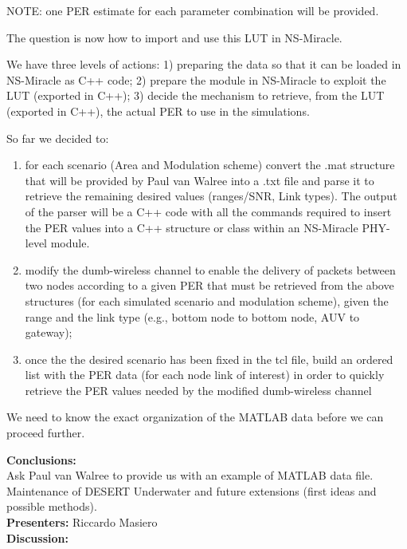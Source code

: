 \documentclass[11pt,journal,draftclsnofoot,onecolumn,twoside,letterpaper]{IEEEtran}
\theoremstyle{definition} \newtheorem{definition}[]{Definition}
\theoremstyle{theorem} \newtheorem{theorem}[]{Theorem}
\begin{document}
NOTE: one PER estimate for each parameter combination will be provided.

The question is now how to import and use this LUT in NS-Miracle.

We have three levels of actions: 1) preparing the data so that it can be loaded in NS-Miracle as C++ code; 2) prepare the module in NS-Miracle to exploit the LUT (exported in C++); 3) decide the mechanism to retrieve, from the LUT (exported in C++), the actual PER to use in the simulations.

So far we decided to:
\begin{enumerate}
 \item for each scenario (Area and Modulation scheme) convert the .mat structure that will be provided by Paul van Walree into a .txt file and parse it to retrieve the remaining desired values (ranges/SNR, Link types). The output of the parser will be a C++ code with all the commands required to insert the PER values into a C++ structure or class within an NS-Miracle PHY-level module.  
 \item modify the dumb-wireless channel to enable the delivery of packets between two nodes according to a given PER that must be retrieved from the above structures (for each simulated scenario and modulation scheme), given the range and the link type (e.g., bottom node to bottom node, AUV to gateway); 
 \item once the the desired scenario has been fixed in the tcl file, build an ordered list with the PER data (for each node link of interest) in order to quickly retrieve the PER values needed by the modified dumb-wireless channel
\end{enumerate} 

We need to know the exact organization of the MATLAB data before we can proceed further.

{\bf Conclusions:}\\
Ask Paul van Walree to provide us with an example of MATLAB data file.
\  \\

 Maintenance of DESERT Underwater and future extensions (first ideas and possible methods).\\
{\bf Presenters:} Riccardo Masiero\\
{\bf Discussion:}\\
\end{document}
